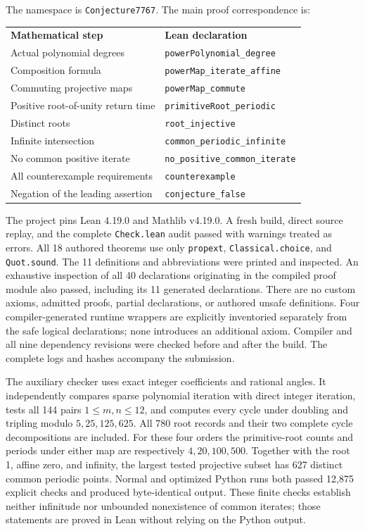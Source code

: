 \documentclass[11pt]{article}
\begin{document}
The namespace is \texttt{Conjecture7767}. The main proof correspondence is:
\begin{center}
\begin{tabular}{ll}
\textbf{Mathematical step} & \textbf{Lean declaration}\\[3pt]
Actual polynomial degrees & \texttt{powerPolynomial\_degree}\\
Composition formula & \texttt{powerMap\_iterate\_affine}\\
Commuting projective maps & \texttt{powerMap\_commute}\\
Positive root-of-unity return time & \texttt{primitiveRoot\_periodic}\\
Distinct roots & \texttt{root\_injective}\\
Infinite intersection & \texttt{common\_periodic\_infinite}\\
No common positive iterate & \texttt{no\_positive\_common\_iterate}\\
All counterexample requirements & \texttt{counterexample}\\
Negation of the leading assertion & \texttt{conjecture\_false}
\end{tabular}
\end{center}

The project pins Lean 4.19.0 and Mathlib v4.19.0. A fresh build, direct
source replay, and the complete \texttt{Check.lean} audit passed with warnings
treated as errors. All 18 authored theorems use only \texttt{propext},
\texttt{Classical.choice}, and \texttt{Quot.sound}. The 11 definitions and
abbreviations were printed and inspected. An exhaustive inspection of all
40 declarations originating in the compiled proof module also passed,
including its 11 generated declarations. There are no custom axioms,
admitted proofs, partial declarations, or authored unsafe definitions. Four
compiler-generated runtime wrappers are explicitly inventoried separately
from the safe logical declarations; none introduces an additional axiom.
Compiler and all nine dependency revisions were checked before and after
the build. The complete logs and hashes accompany the submission.

The auxiliary checker uses exact integer coefficients and rational angles.
It independently compares sparse polynomial iteration with direct integer
iteration, tests all 144 pairs $1\leq m,n\leq12$, and computes every cycle
under doubling and tripling modulo $5,25,125,625$. All 780 root records and
their two complete cycle decompositions are included. For these four orders
the primitive-root counts and periods under either map are respectively
$4,20,100,500$. Together with the root 1, affine zero, and infinity, the
largest tested projective subset has 627 distinct common periodic points.
Normal and optimized Python runs both passed 12,875 explicit checks and
produced byte-identical output. These finite checks establish neither
infinitude nor unbounded nonexistence of common iterates; those statements
are proved in Lean without relying on the Python output.
\end{document}
